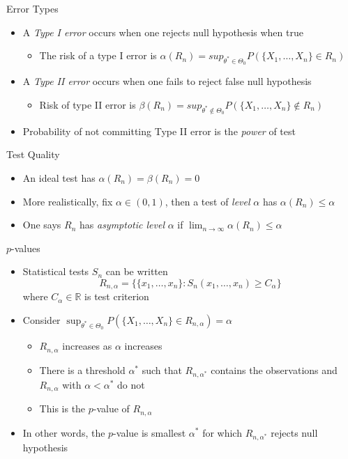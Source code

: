 \documentclass{beamer}
\begin{document}
\begin{frame}{Error Types}  
\begin{itemize} 
 \item A \emph{Type I error} occurs when one rejects null hypothesis when true
 \begin{itemize}
 \item The risk of a type I error is $\alpha(R_n) = sup_{\theta^* \in \Theta_0} P(\{X_1, \ldots, X_n\} \in R_n)$
 \end{itemize} 
 \item A \emph{Type II error} occurs when one fails to reject false null hypothesis
  \begin{itemize}
 \item Risk of type II error is $\beta(R_n) = sup_{\theta^* \notin \Theta_0} P(\{X_1, \ldots, X_n\} \notin R_n)$
 \end{itemize} 
 \item Probability of not committing Type II error is the \emph{power} of test
 
\end{itemize}
\end{frame}

\begin{frame}{Test Quality}
\begin{itemize} 
 \item An ideal test has $\alpha(R_n) = \beta(R_n) = 0$
 \item More realistically, fix $\alpha \in (0, 1)$, then a test of \emph{level} $\alpha$ has $\alpha(R_n) \leq \alpha$ 
 \item One says $R_n$ has \emph{asymptotic level} $\alpha$ if $\lim_{n \rightarrow \infty} \alpha(R_n) \leq \alpha$
\end{itemize} 
\end{frame}

\begin{frame}{$p$-values} 
\begin{itemize} 
 \item Statistical tests $S_n$ can be written 
 \begin{displaymath} 
  R_{n, \alpha} = \{\{x_1, \ldots, x_n\}: S_n(x_1, \ldots, x_n) \geq C_\alpha\}
 \end{displaymath}
  where $C_\alpha \in \mathbb{R}$ is test criterion 
 \item Consider $\sup_{\theta^* \in \Theta_0} P(\{X_1, \ldots, X_n\} \in R_{n, \alpha}) = \alpha$
  \begin{itemize}
  \item $R_{n, \alpha}$ increases as $\alpha$ increases 
  \item There is a threshold $\alpha^*$ such that $R_{n, \alpha^*}$ contains the observations and $R_{n, \alpha}$ with $\alpha < \alpha^*$ do not 
  \item This is the $p$-value of $R_{n, \alpha}$ 
  \end{itemize} 
 \item In other words, the $p$-value is smallest $\alpha^*$ for which $R_{n, \alpha^*}$ rejects null hypothesis  
\end{itemize}
\end{frame}
\end{document}
